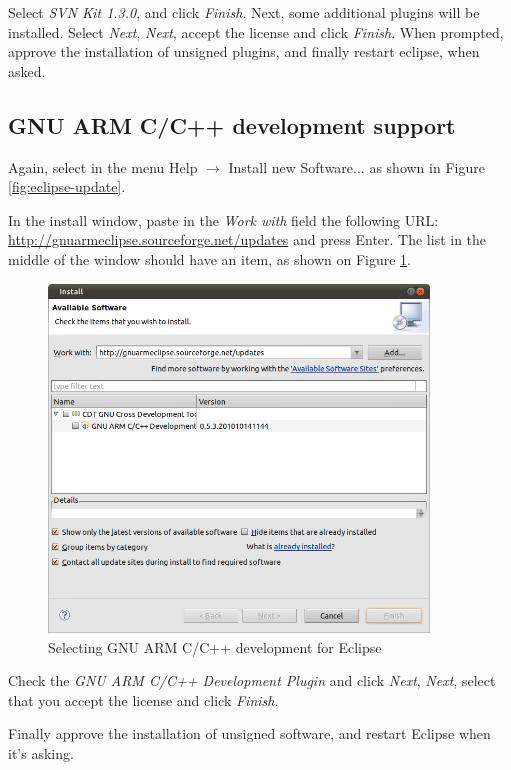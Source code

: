 \documentclass[a4paper, 10pt]{article}
\begin{document}
Select \emph{SVN Kit 1.3.0}, and click \emph{Finish}. Next, some additional plugins
will be installed.
Select \emph{Next},
\emph{Next}, accept the license and click \emph{Finish}.
When prompted, approve the installation of unsigned plugins,
and finally restart eclipse, when asked.


\subsection{GNU ARM C/C++ development support}

Again, select in the menu Help $\rightarrow$ Install new Software... as shown in
Figure \ref{fig:eclipse-update}.

In the install window, paste in the \emph{Work with} field
the following URL:
\url{http://gnuarmeclipse.sourceforge.net/updates} and press Enter.
The list in the middle of the window should have an item, as shown on
Figure \ref{fig:eclipse-gnu-arm}.

    \begin{figure}[H]
    \centering
        \includegraphics[width=0.9\textwidth]{./png-install-guide/eclipse-gnu-arm.png}
        \caption{Selecting GNU ARM C/C++ development for Eclipse}
        \label{fig:eclipse-gnu-arm}
    \end{figure}

Check the \emph{GNU ARM C/C++ Development Plugin} and click \emph{Next},
\emph{Next}, select that you accept the license and click \emph{Finish}.

Finally approve the installation of unsigned software,
and restart Eclipse when it's asking.
\end{document}
